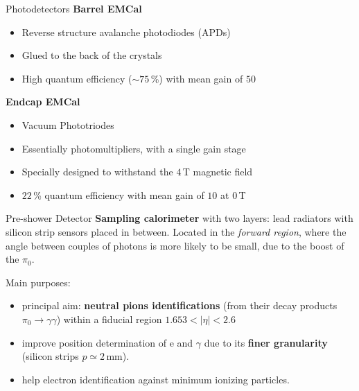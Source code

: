 \documentclass[10pt]{beamer}
\begin{document}
\begin{frame}{Photodetectors}
    \textbf{Barrel EMCal}
    \begin{itemize}
        \item Reverse structure avalanche photodiodes (APDs)
        \item Glued to the back of the crystals
        \item High quantum efficiency ($\sim 75$\,\%) with mean gain of $50$
    \end{itemize}{}
    
    \textbf{Endcap EMCal}
    \begin{itemize}
        \item Vacuum Phototriodes
        \item Essentially photomultipliers, with a single gain stage
        \item Specially designed to withstand the $4$\,T magnetic field
        \item $22$\,\% quantum efficiency with mean gain of $10$ at $0$\,T
    \end{itemize}
\end{frame}

\begin{frame}{Pre-shower Detector}
    \textbf{Sampling calorimeter} with two layers: lead radiators with silicon strip sensors placed in between.
    Located in the \emph{forward region}, where the angle between couples of photons is more likely to be small, due to the boost of the $\pi_0$.
    
    Main purposes:
    \begin{itemize}
        \item principal aim: \textbf{neutral pions identifications} (from their decay products $\pi_0 \rightarrow \gamma \gamma$) within a fiducial region $1.653 < |\eta| < 2.6 $  
        \item improve position determination of e and $\gamma$ due to its \textbf{finer granularity} (silicon strips $p\simeq2\,$mm).
        \item help electron identification against minimum ionizing particles.
    \end{itemize}{}
    
\end{frame}
\end{document}
